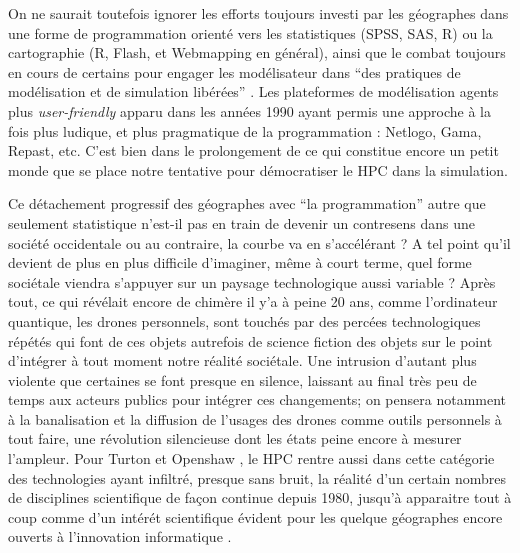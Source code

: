 On ne saurait toutefois ignorer les efforts toujours investi par les géographes dans une forme de programmation orienté vers les statistiques (SPSS, SAS, R) ou la cartographie (R, Flash, et Webmapping en général), ainsi que le combat toujours en cours de certains pour engager les modélisateur dans \enquote{des pratiques de modélisation et de simulation libérées} \autocite{Banos2013}. Les plateformes de modélisation agents plus \textit{user-friendly} apparu dans les années 1990 ayant permis une approche à la fois plus ludique, et plus pragmatique de la programmation : Netlogo, Gama, Repast, etc. C'est bien dans le prolongement de ce qui constitue encore un petit monde que se place notre tentative pour démocratiser le HPC dans la simulation.

Ce détachement progressif des géographes avec \enquote{la programmation} autre que seulement statistique n’est-il pas en train de devenir un contresens dans une société occidentale ou au contraire, la courbe va en s'accélérant ? A tel point qu'il devient de plus en plus difficile d'imaginer, même à court terme, quel forme sociétale viendra s'appuyer sur un paysage technologique aussi variable ? Après tout, ce qui révélait encore de chimère il y'a à peine 20 ans, comme l'ordinateur quantique, les drones personnels, sont touchés par des percées technologiques répétés qui font de ces objets autrefois de science fiction des objets sur le point d'intégrer à tout moment notre réalité sociétale. Une intrusion d'autant plus violente que certaines se font presque en silence, laissant au final très peu de temps aux acteurs publics pour intégrer ces changements; on pensera notamment à la banalisation et la diffusion de l'usages des drones comme outils personnels à tout faire, une révolution silencieuse dont les états peine encore à mesurer l'ampleur. Pour Turton et Openshaw \textcite{openshaw_revolution}, le HPC rentre aussi dans cette catégorie des technologies ayant infiltré, presque sans bruit, la réalité d'un certain nombres de disciplines scientifique de façon continue depuis 1980, jusqu'à apparaitre tout à coup comme d'un intérét scientifique évident pour les quelque géographes encore ouverts à l'innovation informatique .

